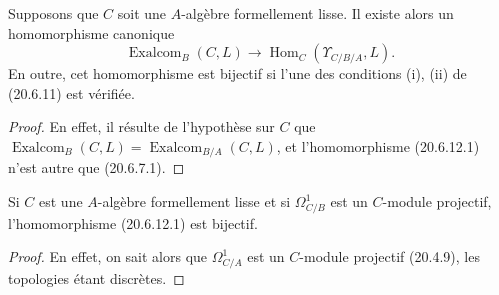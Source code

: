 \begin{corollary}[20.6.12]
\label{0.20.6.12-fr}
Supposons que $C$ soit une $A$-algèbre formellement lisse. Il existe alors
un homomorphisme canonique
\begin{equation}
\tag{20.6.12.1}
\label{0.20.6.12.1-fr}
  \operatorname{Exalcom}_B(C,L)\longrightarrow
  \operatorname{Hom}_C(\Upsilon_{C/B/A},L).
\end{equation}
En outre, cet homomorphisme est bijectif si l'une des conditions (i),
(ii) de (20.6.11) est vérifiée.
\end{corollary}

\begin{proof}
En effet, il résulte de l'hypothèse sur $C$ que
$\operatorname{Exalcom}_B(C,L)=\operatorname{Exalcom}_{B/A}(C,L)$, et
l'homomorphisme (20.6.12.1) n'est autre que (20.6.7.1).
\end{proof}

\begin{corollary}[20.6.13]
\label{0.20.6.13-fr}
Si $C$ est une $A$-algèbre formellement lisse et si $\Omega^1_{C/B}$ est
un $C$-module projectif, l'homomorphisme (20.6.12.1) est bijectif.
\end{corollary}

\begin{proof}
En effet, on sait alors que $\Omega^1_{C/A}$ est un $C$-module projectif
(20.4.9), les topologies étant discrètes.
\end{proof}


